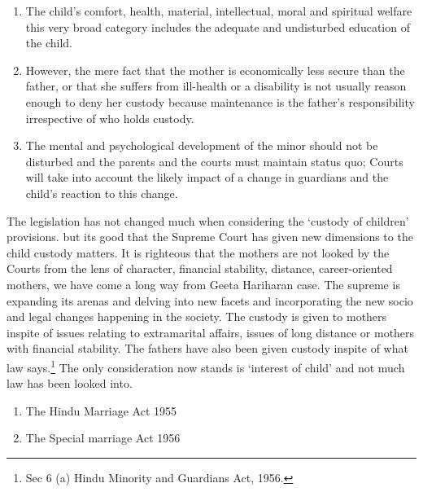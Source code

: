 \begin{multicols}{2}
\begin{enumerate}
\item The child's comfort, health, material, intellectual, moral and spiritual welfare this very
broad category includes the adequate and undisturbed education of the child.

\item However, the mere fact that the mother is economically less secure than the father, or that
she suffers from ill-health or a disability is not usually reason enough to deny her custody
because maintenance is the father's responsibility irrespective of who holds custody.

\item The mental and psychological development of the minor should not be disturbed and the
parents and the courts must maintain status quo; Courts will take into account the likely
impact of a change in guardians and the child's reaction to this change.
\end{enumerate}


\vspace{-.4cm}


\noi
The legislation has not changed much when considering the ‘custody of children’ provisions. but
its good that the Supreme Court has given new dimensions to the child custody matters. It is
righteous that the mothers are not looked by the Courts from the lens of character, financial
stability, distance, career-oriented mothers, we have come a long way from Geeta Hariharan case.
The supreme is expanding its arenas and delving into new facets and incorporating the new socio
and legal changes happening in the society. The custody is given to mothers inspite of issues
relating to extramarital affairs, issues of long distance or mothers with financial stability. The
fathers have also been given custody inspite of what law says.\footnote{Sec 6 (a) Hindu Minority and Guardians Act, 1956.} The only consideration now stands is ‘interest of child’ and not much law has been looked into.


\vspace{-.3cm}

\begin{enumerate}

\itemsep=0pt

\item The Hindu Marriage Act 1955

\item The Special marriage Act 1956


\end{enumerate}
\end{multicols}

